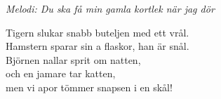 {\footnotesize\textit{Melodi: Du ska få min gamla kortlek när jag dör}}\par
\vspace{10pt}
Tigern slukar snabb buteljen med ett vrål.\\
Hamstern sparar sin a flaskor, han är snål.\\
Björnen nallar sprit om natten, \\
och en jamare tar katten,\\
men vi apor tömmer snapsen i en skål!
